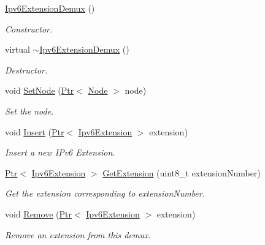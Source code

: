 \begin{DoxyCompactItemize}
\item 
\hyperlink{classns3_1_1Ipv6ExtensionDemux_a04a73cd05d8312ae18ff8d52123a4e7d}{Ipv6\+Extension\+Demux} ()
\begin{DoxyCompactList}\small\item\em Constructor. \end{DoxyCompactList}\item 
virtual \hyperlink{classns3_1_1Ipv6ExtensionDemux_ad5d6aab644d7d6fd5ed443b163547d3a}{$\sim$\+Ipv6\+Extension\+Demux} ()
\begin{DoxyCompactList}\small\item\em Destructor. \end{DoxyCompactList}\item 
void \hyperlink{classns3_1_1Ipv6ExtensionDemux_a28304769ae7aa6bb6a82d5b15b190d14}{Set\+Node} (\hyperlink{classns3_1_1Ptr}{Ptr}$<$ \hyperlink{classns3_1_1Node}{Node} $>$ node)
\begin{DoxyCompactList}\small\item\em Set the node. \end{DoxyCompactList}\item 
void \hyperlink{classns3_1_1Ipv6ExtensionDemux_afef15628ad5fc15b3eb40423cb47599c}{Insert} (\hyperlink{classns3_1_1Ptr}{Ptr}$<$ \hyperlink{classns3_1_1Ipv6Extension}{Ipv6\+Extension} $>$ extension)
\begin{DoxyCompactList}\small\item\em Insert a new I\+Pv6 Extension. \end{DoxyCompactList}\item 
\hyperlink{classns3_1_1Ptr}{Ptr}$<$ \hyperlink{classns3_1_1Ipv6Extension}{Ipv6\+Extension} $>$ \hyperlink{classns3_1_1Ipv6ExtensionDemux_afbaa6248b2de6df3730e87e3fd465aa8}{Get\+Extension} (uint8\+\_\+t extension\+Number)
\begin{DoxyCompactList}\small\item\em Get the extension corresponding to extension\+Number. \end{DoxyCompactList}\item 
void \hyperlink{classns3_1_1Ipv6ExtensionDemux_ad0e2f15ad2c6d66e725c5df91749c40f}{Remove} (\hyperlink{classns3_1_1Ptr}{Ptr}$<$ \hyperlink{classns3_1_1Ipv6Extension}{Ipv6\+Extension} $>$ extension)
\begin{DoxyCompactList}\small\item\em Remove an extension from this demux. \end{DoxyCompactList}\end{DoxyCompactItemize}

